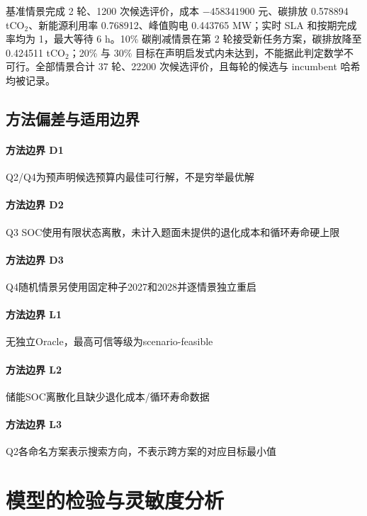 \documentclass[withoutpreface,bwprint]{cumcmthesis}
\begin{document}
基准情景完成 2 轮、1200 次候选评价，成本 $-458341900$ 元、碳排放 0.578894 tCO$_2$、新能源利用率 0.768912、峰值购电 0.443765 MW；实时 SLA 和按期完成率均为 1，最大等待 6 h。10\% 碳削减情景在第 2 轮接受新任务方案，碳排放降至 0.424511 tCO$_2$；20\% 与 30\% 目标在声明启发式内未达到，不能据此判定数学不可行。全部情景合计 37 轮、22200 次候选评价，且每轮的候选与 incumbent 哈希均被记录。



\subsection{方法偏差与适用边界}
\paragraph{方法边界 D1}Q2/Q4为预声明候选预算内最佳可行解，不是穷举最优解

\paragraph{方法边界 D2}Q3 SOC使用有限状态离散，未计入题面未提供的退化成本和循环寿命硬上限

\paragraph{方法边界 D3}Q4随机情景另使用固定种子2027和2028并逐情景独立重启

\paragraph{方法边界 L1}无独立Oracle，最高可信等级为scenario-feasible

\paragraph{方法边界 L2}储能SOC离散化且缺少退化成本/循环寿命数据

\paragraph{方法边界 L3}Q2各命名方案表示搜索方向，不表示跨方案的对应目标最小值

\section{模型的检验与灵敏度分析}
\end{document}
